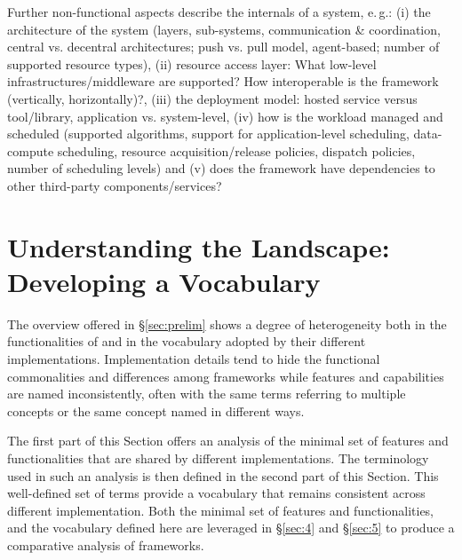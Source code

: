 \documentclass{sig-alternate}
\begin{document}
Further non-functional aspects describe the internals of a \pilotjob system, 
e.\,g.: (i) the architecture of the system (layers, sub-systems,
communication \& coordination, central vs. decentral architectures; push vs.
pull model, agent-based; number of supported resource types), (ii) resource
access layer: What low-level infrastructures/middleware are supported? How
interoperable is the framework (vertically, horizontally)?, (iii) the
deployment model: hosted service versus tool/library, application vs.
system-level, (iv) how is the workload managed and scheduled (supported
algorithms, support for application-level scheduling, data-compute scheduling,
resource acquisition/release policies, dispatch policies, number of scheduling
levels) and (v) does the framework have dependencies to other third-party
components/services?




\section{Understanding the Landscape: Developing a Vocabulary}
\label{sec:vocab}

The overview offered in \S\ref{sec:prelim} shows a degree of
heterogeneity both in the functionalities of \pilotjobs and in the
vocabulary adopted by their different implementations. Implementation
details tend to hide the functional commonalities and differences
among \pilotjobs frameworks while features and capabilities are named
inconsistently, often with the same terms referring to multiple
concepts or the same concept named in different ways.

The first part of this Section offers an analysis of the minimal set
of features and functionalities that are shared by different \pilotjob
implementations. The terminology used in such an analysis is then
defined in the second part of this Section. This well-defined set of
terms provide a vocabulary that remains consistent across different
\pilotjob implementation. Both the minimal set of features and
functionalities, and the vocabulary defined here are leveraged in
\S\ref{sec:4} and \S\ref{sec:5} to produce a comparative analysis of
\pilotjobs frameworks.
\end{document}
